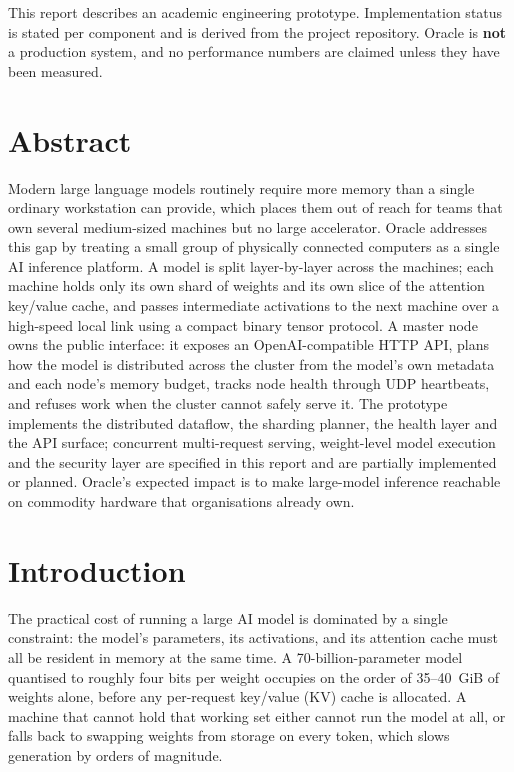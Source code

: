 \documentclass[11pt,a4paper]{article}
\begin{document}
\begin{titlepage}
\vfill
{\footnotesize\color{ogray}
This report describes an academic engineering prototype. Implementation status is
stated per component and is derived from the project repository. Oracle is
\textbf{not} a production system, and no performance numbers are claimed unless
they have been measured.\par}
\end{titlepage}

\section*{Abstract}

Modern large language models routinely require more memory than a single
ordinary workstation can provide, which places them out of reach for teams that
own several medium-sized machines but no large accelerator. Oracle addresses
this gap by treating a small group of physically connected computers as a single
AI inference platform. A model is split layer-by-layer across the machines; each
machine holds only its own shard of weights and its own slice of the attention
key/value cache, and passes intermediate activations to the next machine over a
high-speed local link using a compact binary tensor protocol. A master node owns
the public interface: it exposes an OpenAI-compatible HTTP API, plans how the
model is distributed across the cluster from the model's own metadata and each
node's memory budget, tracks node health through UDP heartbeats, and refuses work
when the cluster cannot safely serve it. The prototype implements the
distributed dataflow, the sharding planner, the health layer and the API surface;
concurrent multi-request serving, weight-level model execution and the security
layer are specified in this report and are partially implemented or planned.
Oracle's expected impact is to make large-model inference reachable on
commodity hardware that organisations already own.

\section{Introduction}

The practical cost of running a large AI model is dominated by a single
constraint: the model's parameters, its activations, and its attention cache
must all be resident in memory at the same time. A 70-billion-parameter model
quantised to roughly four bits per weight occupies on the order of 35--40~GiB of
weights alone, before any per-request key/value (KV) cache is allocated. A
machine that cannot hold that working set either cannot run the model at all, or
falls back to swapping weights from storage on every token, which slows
generation by orders of magnitude.
\end{document}
